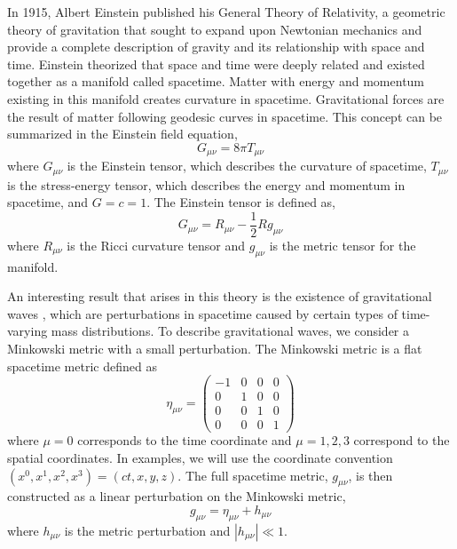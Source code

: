 In 1915, Albert Einstein published his General Theory of Relativity, a 
geometric theory of gravitation that sought to expand upon Newtonian 
mechanics and provide a complete description of gravity and its 
relationship with space and time. Einstein theorized that space 
and time were deeply related and existed together as a manifold 
called spacetime. Matter with energy and momentum 
existing in this manifold creates 
curvature in spacetime. Gravitational forces are the result of 
matter following geodesic curves in spacetime. This concept can 
be summarized in the Einstein field equation, 
\begin{equation}
G_{\mu\nu} = 8\pi T_{\mu\nu}
\label{eq:EFE}
\end{equation}
where $G_{\mu\nu}$ is the Einstein tensor, which describes the 
curvature of spacetime, $T_{\mu\nu}$ is the 
stress-energy tensor, which describes the energy and momentum in 
spacetime, and  $G=c=1$. The Einstein tensor is defined as,
\begin{equation}
G_{\mu\nu} = R_{\mu\nu} - \frac{1}{2}Rg_{\mu\nu}
\end{equation}
where $R_{\mu\nu}$ is the Ricci curvature tensor and $g_{\mu\nu}$ is 
the metric tensor for the manifold.

An interesting result that arises in this theory  is the 
existence of gravitational waves \cite{Einstein:1916,Einstein:1918}, 
which are perturbations in 
spacetime caused by certain types of time-varying mass distributions. 
To describe gravitational waves, we consider 
a Minkowski metric with a small perturbation. The Minkowski metric 
is a flat spacetime metric defined as
\begin{equation}
\eta_{\mu\nu} = 
  \begin{pmatrix}
   -1 & 0 & 0 & 0 \\
    0 & 1 & 0 & 0 \\
    0 & 0 & 1 & 0 \\
    0 & 0 & 0 & 1
  \end{pmatrix}
\end{equation}
where $\mu = 0$ corresponds to the time coordinate and $\mu = {1,2,3}$ 
correspond to the spatial coordinates. In examples, we will use the coordinate 
convention $(x^0,x^1,x^2,x^3) = (ct,x,y,z)$. 
The full spacetime metric, $g_{\mu\nu}$, is then constructed as a 
linear perturbation on the Minkowski metric,
\begin{equation}
g_{\mu\nu} = \eta_{\mu\nu} + h_{\mu\nu}
\end{equation}
where $h_{\mu\nu}$ is the metric perturbation and $|h_{\mu\nu}| \ll 1$.

